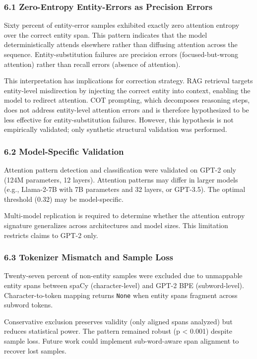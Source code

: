 
\subsubsection{6.1 Zero-Entropy Entity-Errors as Precision Errors}

Sixty percent of entity-error samples exhibited exactly zero attention entropy over the correct entity span. This pattern indicates that the model deterministically attends elsewhere rather than diffusing attention across the sequence. Entity-substitution failures are precision errors (focused-but-wrong attention) rather than recall errors (absence of attention).

This interpretation has implications for correction strategy. RAG retrieval targets entity-level misdirection by injecting the correct entity into context, enabling the model to redirect attention. COT prompting, which decomposes reasoning steps, does not address entity-level attention errors and is therefore hypothesized to be less effective for entity-substitution failures. However, this hypothesis is not empirically validated; only synthetic structural validation was performed.

\subsubsection{6.2 Model-Specific Validation}

Attention pattern detection and classification were validated on GPT-2 only (124M parameters, 12 layers). Attention patterns may differ in larger models (e.g., Llama-2-7B with 7B parameters and 32 layers, or GPT-3.5). The optimal threshold (0.32) may be model-specific.

Multi-model replication is required to determine whether the attention entropy signature generalizes across architectures and model sizes. This limitation restricts claims to GPT-2 only.

\subsubsection{6.3 Tokenizer Mismatch and Sample Loss}

Twenty-seven percent of non-entity samples were excluded due to unmappable entity spans between spaCy (character-level) and GPT-2 BPE (subword-level). Character-to-token mapping returns \texttt{None} when entity spans fragment across subword tokens.

Conservative exclusion preserves validity (only aligned spans analyzed) but reduces statistical power. The pattern remained robust (p < 0.001) despite sample loss. Future work could implement sub-word-aware span alignment to recover lost samples.


